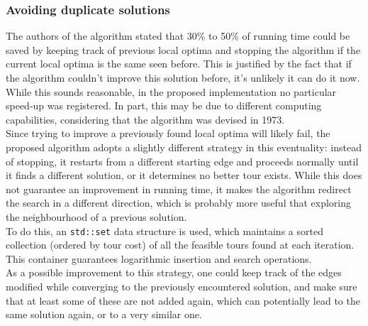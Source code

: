 \subsubsection{Avoiding duplicate solutions}
\label{sssec:checkout}
The authors of the algorithm stated that 30\% to 50\% of running time could be saved by keeping track of previous local optima and stopping the algorithm if the current local optima is the same seen before. This is justified by the fact that if the algorithm couldn't improve this solution before, it's unlikely it can do it now. While this sounds reasonable, in the proposed implementation no particular speed-up was registered. In part, this may be due to different computing capabilities, considering that the algorithm was devised in 1973.\\
Since trying to improve a previously found local optima will likely fail, the proposed algorithm adopts a slightly different strategy in this eventuality: instead of stopping, it restarts from a different starting edge and proceeds normally until it finds a different solution, or it determines no better tour exists. While this does not guarantee an improvement in running time, it makes the algorithm redirect the search in a different direction, which is probably more useful that exploring the neighbourhood of a previous solution.\\
To do this, an \texttt{std::set} data structure is used, which maintains a sorted collection (ordered by tour cost) of all the feasible tours found at each iteration. This container guarantees logarithmic insertion and search operations.\\
As a possible improvement to this strategy, one could keep track of the edges modified while converging to the previously encountered solution, and make sure that at least some of these are not added again, which can potentially lead to the same solution again, or to a very similar one.

\clearpage
